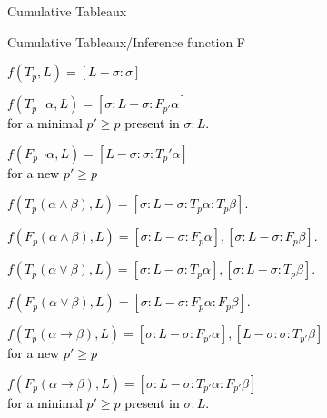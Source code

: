 \documentclass{beamer}
\begin{document}
\begin{frame}{Cumulative Tableaux}
{{{
        }
        }
        }

\end{frame}







\begin{frame}{Cumulative Tableaux/Inference function F}
    \scriptsize{
    \begin{itemize}

        \item\textcolor{black}{ $f(T_{p} ,L) = [L - \sigma: \sigma ] $ 
        \item $f(T_{p} \neg \alpha,L) = [\sigma :L - \sigma: F_{p'}\alpha] $ \\for a minimal $p' \geq p$ present in $\sigma:L$.
        \textcolor{black}{\item $f(F_{p} \neg \alpha,L) = [L - \sigma : \sigma : T_p' \alpha]$  \\for a new $p' \geq p$}
        \item $f(T_{p} (\alpha \land \beta), L) = [\sigma :L - \sigma: T_{p} \alpha : T_{p} \beta]$.
        \item $f(F_{p} (\alpha \land \beta), L) = [\sigma :L - \sigma: F_{p} \alpha],[ \sigma :L - \sigma: F_{p} \beta]$.
        \textcolor{black}{\item $f(T_{p} (\alpha \lor \beta), L) = [\sigma :L - \sigma: T_{p} \alpha],[ \sigma :L - \sigma: T_{p} \beta]$.}
        \item $f(F_{p} (\alpha \lor \beta), L) = [\sigma :L - \sigma: F_{p} \alpha : F_{p} \beta]$.
        \item $f(T_{p} (\alpha \to \beta), L) = [\sigma :L - \sigma: F_{p'} \alpha],[ L - \sigma : \sigma : T_{p'} \beta]$ \\for a new $p' \geq p$ 
        \item $f(F_{p} (\alpha \to \beta), L) = [\sigma :L - \sigma: T_{p'} \alpha : F_{p'} \beta]$ \\for a minimal $p' \geq p$ present in $\sigma:L$.}
    \end{itemize} 
    }
\end{frame}
\end{document}
